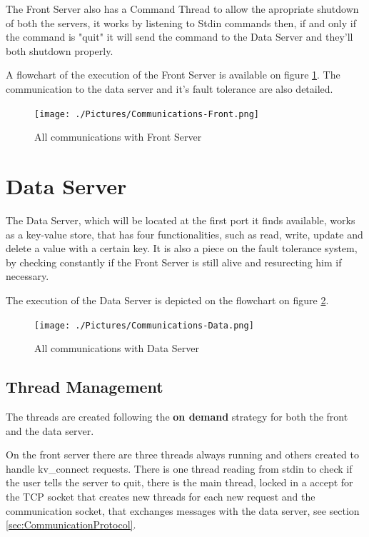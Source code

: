 \documentclass[12pt]{article} %
\begin{document}
The Front Server also has a Command Thread to allow the apropriate shutdown of both the servers,
it works by listening to Stdin commands then, if and only if the command is "quit" it will send the command
to the Data Server and they'll both shutdown properly.

A flowchart of the execution of the Front Server is available on figure \ref{fig:CommunicationsFront}.
The communication to the data server and it's fault tolerance are also detailed.

\begin{figure}[ht]
\centering
\texttt{[image: ./Pictures/Communications-Front.png]}
\caption{All communications with Front Server}\label{fig:CommunicationsFront}
\end{figure}

\section{Data Server}
\label{sec:DataServer}

The Data Server, which will be located at the first port it finds available,
works as a key-value store, that has four functionalities, such as read,
write, update and delete a value with a certain key. It is also a piece on the fault tolerance system,
by checking constantly if the Front Server is still alive and resurecting him if necessary.

The execution of the Data Server is depicted on the flowchart on figure \ref{fig:CommunicationsData}.

\begin{figure}[ht]
\centering
\texttt{[image: ./Pictures/Communications-Data.png]}
\caption{All communications with Data Server}\label{fig:CommunicationsData}
\end{figure}

\subsection{Thread Management}
\label{sub:ThreadManagement}

The threads are created following the \textbf{on demand} strategy for both the front and
the data server.

On the front server there are three threads always running and others created
to handle kv\_connect requests. There is one thread reading from stdin to check if
the user tells the server to quit, there is the main thread, locked in a accept for the
TCP socket that creates new threads for each new request and the communication
socket, that exchanges messages with the data server, see section \ref{sec:CommunicationProtocol}.
\end{document}
